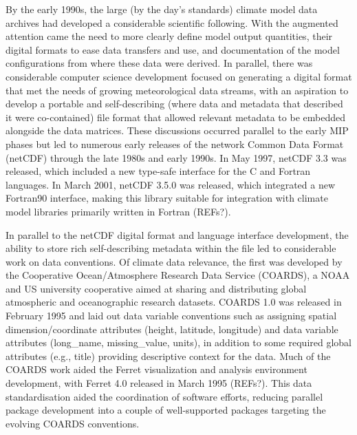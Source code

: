 \documentclass[gmd, preprint]{copernicus}
\newcommand{\mycomment}[1]{}
\def\cred#1{{\color{red}#1}}
\begin{document}
By the early 1990s, the large (by the day's standards) climate model data archives had developed a considerable scientific following. With the augmented attention came the need to more clearly define model output quantities, their digital formats to ease data transfers and use, and documentation of the model configurations from where these data were derived. In parallel, there was considerable computer science development focused on generating a digital format that met the needs of growing meteorological data streams, with an aspiration to develop a portable and self-describing (where data and metadata that described it were co-contained) file format that allowed relevant metadata to be embedded alongside the data matrices. These discussions occurred parallel to the early MIP phases but led to numerous early releases of the network Common Data Format (netCDF) through the late 1980s and early 1990s. In May 1997, netCDF 3.3 was released, which included a new type-safe interface for the C and Fortran languages. In March 2001, netCDF 3.5.0 was released, which integrated a new Fortran90 interface, making this library suitable for integration with climate model libraries primarily written in Fortran \cred{(REFs?)}.
\mycomment{
https://docs.unidata.ucar.edu/nug/2.0-draft/netcdf_history.html
}

In parallel to the netCDF digital format and language interface development, the ability to store rich self-describing metadata within the file led to considerable work on data conventions. Of climate data relevance, the first was developed by the Cooperative Ocean/Atmosphere Research Data Service (COARDS), a NOAA and US university cooperative aimed at sharing and distributing global atmospheric and oceanographic research datasets. COARDS 1.0 was released in February 1995 and laid out data variable conventions such as assigning spatial dimension/coordinate attributes (height, latitude, longitude) and data variable attributes (long\_name, missing\_value, units), in addition to some required global attributes (e.g., title) providing descriptive context for the data. Much of the COARDS work aided the Ferret visualization and analysis environment development, with Ferret 4.0 released in March 1995 \cred{(REFs?)}. This data standardisation aided the coordination of software efforts, reducing parallel package development into a couple of well-supported packages targeting the evolving COARDS conventions.
\mycomment{
https://ferret.pmel.noaa.gov/Ferret/documentation/coards-netcdf-conventions
https://ferret.pmel.noaa.gov/static/Documentation/Release_Notes/v400.html
Also NCAR CSM - see http://cfconventions.org/conventions.html
}
\end{document}
